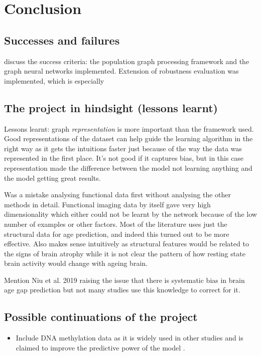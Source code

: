 \chapter{Conclusion}



\section{Successes and failures}

discuss the success criteria: the population graph processing framework and the graph neural networks implemented. Extension of robustness evaluation was implemented, which is especially 

\section{The project in hindsight (lessons learnt)}
Lessons learnt: graph \textit{representation} is more important than the framework used. Good representations of the dataset can help guide the learning algorithm in the right way as it gets the intuitions faster just because of the way the data was represented in the first place. It's not good if it captures bias, but in this case representation made the difference between the model not learning anything and the model getting great results.

Was a mistake analysing functional data first without analysing the other methods in detail. Functional imaging data by itself gave very high dimensionality which either could not be learnt by the network because of the low number of examples or other factors. Most of the literature uses just the structural data for age prediction, and indeed this turned out to be more effective. Also makes sense intuitively as structural features would be related to the signs of brain atrophy while it is not clear the pattern of how resting state brain activity would change with ageing brain.

Mention Niu et al. 2019 raising the issue that there is systematic bias in brain age gap prediction but not many studies use this knowledge to correct for it. 


\section{Possible continuations of the project}
\begin{itemize}
    \item Include DNA methylation data as it is widely used in other studies and is claimed to improve the predictive power of the model \cite{cole2018brain}.
\end{itemize}


